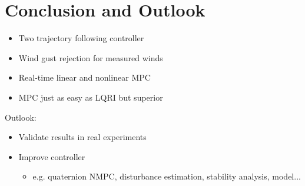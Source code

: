 \ETHslide
\section*{Conclusion and Outlook}
\vspace*{\fill}

\begin{itemize}
\item[\ETHitem] Two trajectory following controller
\item[\ETHitem] Wind gust rejection for measured winds
\item[\ETHitem] Real-time linear and nonlinear MPC
\item[\ETHitem] MPC just as easy as LQRI but superior
\end{itemize}
Outlook:
\begin{itemize}
\item[\ETHitem] Validate results in real experiments
\item[\ETHitem] Improve controller
\begin{itemize}
\item[\ETHitem] e.g. quaternion NMPC, disturbance estimation, stability analysis, model...
\end{itemize}
\end{itemize}

\vspace*{\fill}
\clearpage